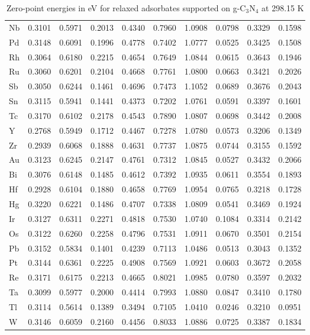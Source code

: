 \begin{table}[h]
{\begin{tabular}{*{10}{l}}
    Nb & 0.3101 & 0.5971 & 0.2013 & 0.4340 & 0.7960 & 1.0908 & 0.0798 & 0.3329 & 0.1598 \\
    Pd & 0.3148 & 0.6091 & 0.1996 & 0.4778 & 0.7402 & 1.0777 & 0.0525 & 0.3425 & 0.1508 \\
    Rh & 0.3064 & 0.6180 & 0.2215 & 0.4654 & 0.7649 & 1.0844 & 0.0615 & 0.3643 & 0.1946 \\
    Ru & 0.3060 & 0.6201 & 0.2104 & 0.4668 & 0.7761 & 1.0800 & 0.0663 & 0.3421 & 0.2026 \\
    Sb & 0.3050 & 0.6244 & 0.1461 & 0.4696 & 0.7473 & 1.1052 & 0.0689 & 0.3676 & 0.2043 \\
    Sn & 0.3115 & 0.5941 & 0.1441 & 0.4373 & 0.7202 & 1.0761 & 0.0591 & 0.3397 & 0.1601 \\
    Tc & 0.3170 & 0.6102 & 0.2178 & 0.4543 & 0.7890 & 1.0807 & 0.0698 & 0.3442 & 0.2008 \\
    Y  & 0.2768 & 0.5949 & 0.1712 & 0.4467 & 0.7278 & 1.0780 & 0.0573 & 0.3206 & 0.1349 \\
    Zr & 0.2939 & 0.6068 & 0.1888 & 0.4631 & 0.7737 & 1.0875 & 0.0744 & 0.3155 & 0.1592 \\
    Au & 0.3123 & 0.6245 & 0.2147 & 0.4761 & 0.7312 & 1.0845 & 0.0527 & 0.3432 & 0.2066 \\
    Bi & 0.3076 & 0.6148 & 0.1485 & 0.4612 & 0.7392 & 1.0935 & 0.0611 & 0.3554 & 0.1893 \\
    Hf & 0.2928 & 0.6104 & 0.1880 & 0.4658 & 0.7769 & 1.0954 & 0.0765 & 0.3218 & 0.1728 \\
    Hg & 0.3220 & 0.6221 & 0.1486 & 0.4707 & 0.7338 & 1.0809 & 0.0541 & 0.3469 & 0.1924 \\
    Ir & 0.3127 & 0.6311 & 0.2271 & 0.4818 & 0.7530 & 1.0740 & 0.1084 & 0.3314 & 0.2142 \\
    Os & 0.3122 & 0.6260 & 0.2258 & 0.4796 & 0.7531 & 1.0911 & 0.0670 & 0.3501 & 0.2154 \\
    Pb & 0.3152 & 0.5834 & 0.1401 & 0.4239 & 0.7113 & 1.0486 & 0.0513 & 0.3043 & 0.1352 \\
    Pt & 0.3144 & 0.6361 & 0.2225 & 0.4908 & 0.7569 & 1.0921 & 0.0603 & 0.3672 & 0.2058 \\
    Re & 0.3171 & 0.6175 & 0.2213 & 0.4665 & 0.8021 & 1.0985 & 0.0780 & 0.3597 & 0.2032 \\
    Ta & 0.3099 & 0.5977 & 0.2000 & 0.4414 & 0.7993 & 1.0880 & 0.0847 & 0.3410 & 0.1780 \\
    Tl & 0.3114 & 0.5614 & 0.1389 & 0.3494 & 0.7105 & 1.0410 & 0.0246 & 0.3210 & 0.0951 \\
    W  & 0.3146 & 0.6059 & 0.2160 & 0.4456 & 0.8033 & 1.0886 & 0.0725 & 0.3387 & 0.1834 \\
    \hline
  \end{tabular}
  }
  \caption{Zero-point energies in eV for relaxed adsorbates supported on g-C$_3$N$_4$ at 298.15 K}
  \label{si_table7:zpe_g-c3n4}
\end{table}


